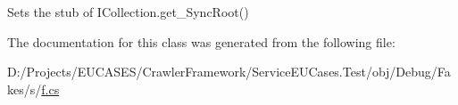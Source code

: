 Sets the stub of I\-Collection.\-get\-\_\-\-Sync\-Root()



The documentation for this class was generated from the following file\-:\begin{DoxyCompactItemize}
\item 
D\-:/\-Projects/\-E\-U\-C\-A\-S\-E\-S/\-Crawler\-Framework/\-Service\-E\-U\-Cases.\-Test/obj/\-Debug/\-Fakes/s/\hyperlink{s_2f_8cs}{f.\-cs}\end{DoxyCompactItemize}

